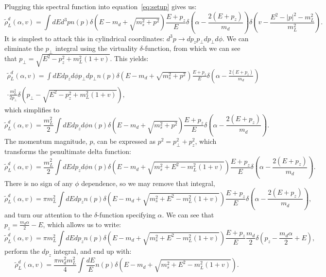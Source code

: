 \documentclass{article}
\begin{document}
  Plugging this spectral function into equation~\ref{eq:setup} gives us:
  \begin{equation}
    \tilde{\rho}_L^d(\alpha,v) = \int dE d^3p n(p) \delta\left(E - m_d + \sqrt{m_s^2 + p^2}\right) \frac{E+p_z}{E}
    \delta\left( \alpha - \frac{2(E+p_z)}{m_d}\right)
    \delta\left( v - \frac{E^2 - |p|^2 - m_L^2}{m_L^2}\right).
  \end{equation}
  It is simplest to attack this in cylindrical coordinates: $d^3p \rightarrow dp_z p_\perp dp_\perp d\phi$. We can eliminate
  the $p_\perp$ integral using the virtuality $\delta$-function, from which we can see that $p_\perp = \sqrt{E^2 -p_z^2 + m_L^2(1+v)}$.
  This yields:
  \begin{equation}
    \begin{split}
    \tilde{\rho}_L^d(\alpha,v) = \int dE dp_z d\phi p_\perp dp_\perp n(p) \delta\left(E - m_d + \sqrt{m_s^2 + p^2}\right) \frac{E+p_z}{E}
    \delta\left( \alpha - \frac{2(E+p_z)}{m_d}\right)\\
    \cdot \frac{m_L^2}{2p_\perp} \delta\left( p_\perp - \sqrt{E^2 -p_z^2 + m_L^2(1+v)}\right),
    \end{split}
  \end{equation}
  which simplifies to
  \begin{equation}
    \tilde{\rho}_L^d(\alpha,v) = \frac{m_L^2}{2} \int dE dp_z d\phi n(p) \delta\left(E - m_d + \sqrt{m_s^2 + p^2}\right) \frac{E+p_z}{E}
    \delta\left( \alpha - \frac{2(E+p_z)}{m_d}\right).
  \end{equation}
  The momentum magnitude, $p$, can be expressed as $p^2 = p_\perp^2 + p_z^2$, which transforms the penultimate delta function:
  \begin{equation}
    \tilde{\rho}_L^d(\alpha,v) = \frac{m_L^2}{2} \int dE dp_z d\phi n(p) \delta\left(E - m_d + \sqrt{m_s^2 + E^2 - m_L^2(1+v)}\right) \frac{E+p_z}{E}
    \delta\left( \alpha - \frac{2(E+p_z)}{m_d}\right).
  \end{equation}
  There is no sign of any $\phi$ dependence, so we may remove that integral,
  \begin{equation}
    \tilde{\rho}_L^d(\alpha,v) = \pi m_L^2 \int dE dp_z n(p) \delta\left(E - m_d + \sqrt{m_s^2 + E^2 - m_L^2(1+v)}\right) \frac{E+p_z}{E}
    \delta\left( \alpha - \frac{2(E+p_z)}{m_d}\right),
  \end{equation}
  and turn our attention to the $\delta$-function specifying $\alpha$. We can see that $p_z = \frac{m_d \alpha}{2} - E$, which allows us to write:
  \begin{equation}
    \tilde{\rho}_L^d(\alpha,v) = \pi m_L^2 \int dE dp_z n(p) \delta\left(E - m_d + \sqrt{m_s^2 + E^2 - m_L^2(1+v)}\right) \frac{E+p_z}{E}
    \frac{m_d}{2} \delta\left( p_z - \frac{m_d \alpha}{2} + E \right),
  \end{equation}
  perform the $dp_z$ integral, and end up with:
  \begin{equation}
    \tilde{\rho}_L^d(\alpha,v) = \frac{\pi m_d^2 m_L^2}{4} \int \frac{dE}{E} n(p) \delta\left(E - m_d + \sqrt{m_s^2 + E^2 - m_L^2(1+v)}\right).
  \end{equation}
\end{document}
